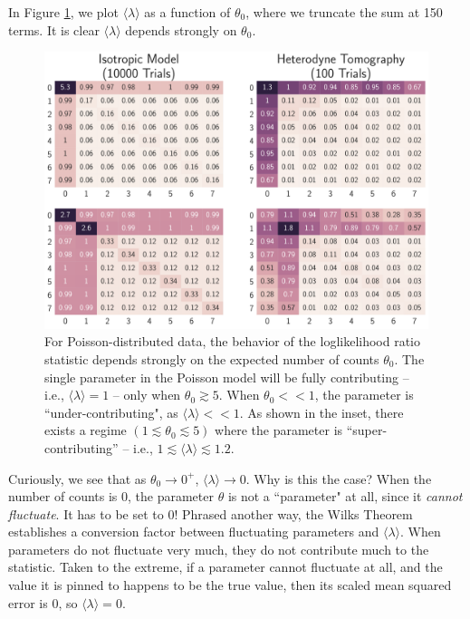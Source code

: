 \documentclass[aps,pra, twocolumn]{revtex4}
\begin{document}
In Figure \ref{fig:poissonbump}, we plot $\langle \lambda \rangle$ as a function of $\theta_{0}$, where we truncate the sum at 150 
terms. It is clear $\langle \lambda \rangle$ 
depends strongly on $\theta_{0}$.
\begin{figure}[ht]
  \includegraphics[width=\columnwidth]{Images/Figure_13.pdf}
 \caption{For Poisson-distributed data, the behavior of the loglikelihood ratio statistic depends strongly on the expected number of counts $\theta_{0}$. The single parameter in the Poisson model will be fully contributing -- i.e., $\langle \lambda \rangle = 1$ -- only when $\theta_{0} \gtrsim 5$. When $\theta_{0} << 1$, the parameter is ``under-contributing", as $\langle \lambda \rangle <<1$. As shown in the inset, there exists a regime $(1 \lesssim \theta_{0} \lesssim 5)$ 
where the parameter is ``super-contributing'' -- i.e., $1 \lesssim \langle \lambda \rangle \lesssim 1.2$.}
\label{fig:poissonbump}
\end{figure}

Curiously, we see that as $\theta_{0} \rightarrow 0^{+}$, $\langle \lambda \rangle \rightarrow 0$. Why is this the case? 
When the number of counts is 0, the parameter $\theta$ is not a ``parameter" at all, since it \emph{cannot fluctuate}. It has to be set to 0! Phrased another way, the Wilks Theorem establishes a conversion factor between fluctuating parameters and $\langle \lambda \rangle$. When parameters do not fluctuate very much, they do not contribute much to the statistic. Taken to the extreme, if a parameter cannot fluctuate at all, and the value it is pinned to happens to be the true value, then its scaled mean squared error is 0, so $\langle \lambda \rangle = 0$.
\end{document}
